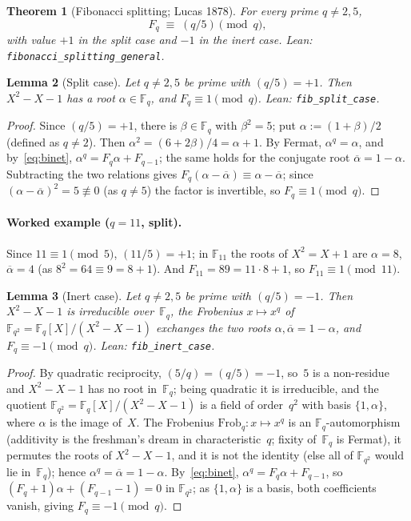 \documentclass[11pt]{amsart}
\newtheorem{Theorem}{Theorem}[section]
\newtheorem{Lemma}[Theorem]{Lemma}
\theoremstyle{definition}
\newcommand{\lean}[1]{\texttt{#1}}
\begin{document}
\begin{Theorem}[Fibonacci splitting; Lucas 1878]\label{thm:fib-main}
For every prime $q\neq2,5$,
\[
  F_{q}\;\equiv\;(q/5)\pmod{q},
\]
with value $+1$ in the split case and $-1$ in the inert case.
\emph{Lean:} \lean{fibonacci\_splitting\_general}.
\end{Theorem}

\begin{Lemma}[Split case]\label{lem:fib-split}
Let $q\neq2,5$ be prime with $(q/5)=+1$.  Then $X^{2}-X-1$ has a root
$\alpha\in\mathbb{F}_{q}$, and $F_{q}\equiv 1\pmod{q}$.
\emph{Lean:} \lean{fib\_split\_case}.
\end{Lemma}

\begin{proof}
Since $(q/5)=+1$, there is $\beta\in\mathbb{F}_{q}$ with $\beta^{2}=5$;
put $\alpha:=(1+\beta)/2$ (defined as $q\neq2$).  Then
$\alpha^{2}=(6+2\beta)/4=\alpha+1$.  By Fermat, $\alpha^{q}=\alpha$, and
by~\eqref{eq:binet}, $\alpha^{q}=F_{q}\alpha+F_{q-1}$; the same holds for
the conjugate root $\overline{\alpha}=1-\alpha$.  Subtracting the two
relations gives $F_{q}(\alpha-\overline{\alpha})\equiv
\alpha-\overline{\alpha}$; since
$(\alpha-\overline{\alpha})^{2}=5\not\equiv0$ (as $q\neq5$) the factor is
invertible, so $F_{q}\equiv1\pmod{q}$.
\end{proof}

\paragraph{Worked example ($q=11$, split).}
Since $11\equiv1\pmod5$, $(11/5)=+1$; in $\mathbb{F}_{11}$ the roots of
$X^{2}=X+1$ are $\alpha=8$, $\overline{\alpha}=4$ (as
$8^{2}=64\equiv9=8+1$).  And $F_{11}=89=11\cdot8+1$, so
$F_{11}\equiv1\pmod{11}$.

\begin{Lemma}[Inert case]\label{lem:fib-inert}
Let $q\neq2,5$ be prime with $(q/5)=-1$.  Then $X^{2}-X-1$ is
irreducible over~$\mathbb{F}_{q}$, the Frobenius $x\mapsto x^{q}$ of
$\mathbb{F}_{q^{2}}=\mathbb{F}_{q}[X]/(X^{2}-X-1)$ exchanges the two
roots $\alpha,\overline{\alpha}=1-\alpha$, and $F_{q}\equiv-1\pmod{q}$.
\emph{Lean:} \lean{fib\_inert\_case}.
\end{Lemma}

\begin{proof}
By quadratic reciprocity, $(5/q)=(q/5)=-1$, so~$5$ is a non-residue
and $X^{2}-X-1$ has no root in~$\mathbb{F}_{q}$; being quadratic it is
irreducible, and the quotient
$\mathbb{F}_{q^{2}}=\mathbb{F}_{q}[X]/(X^{2}-X-1)$ is a field of
order~$q^{2}$ with basis $\{1,\alpha\}$, where $\alpha$ is the image
of~$X$.  The Frobenius $\mathrm{Frob}_{q}\colon x\mapsto x^{q}$ is an
$\mathbb{F}_{q}$-automorphism (additivity is the freshman's dream in
characteristic~$q$; fixity of~$\mathbb{F}_{q}$ is Fermat), it permutes
the roots of $X^{2}-X-1$, and it is not the identity (else all of
$\mathbb{F}_{q^{2}}$ would lie in~$\mathbb{F}_{q}$); hence
$\alpha^{q}=\overline{\alpha}=1-\alpha$.  By~\eqref{eq:binet},
$\alpha^{q}=F_{q}\alpha+F_{q-1}$, so $(F_{q}+1)\alpha+(F_{q-1}-1)=0$ in
$\mathbb{F}_{q^{2}}$; as $\{1,\alpha\}$ is a basis, both coefficients
vanish, giving $F_{q}\equiv-1\pmod{q}$.
\end{proof}
\end{document}
